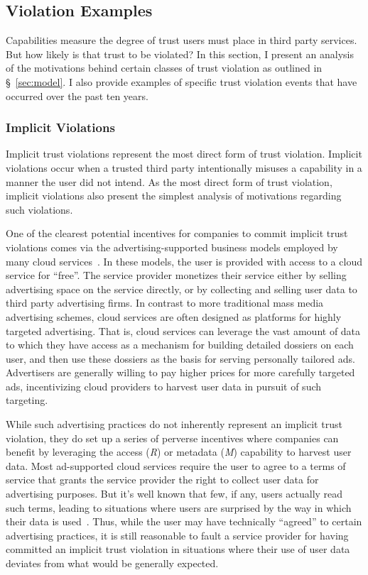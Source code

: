 \subsection{Violation Examples}
\label{sec:analysis:violations}

Capabilities measure the degree of trust users must place in third
party services. But how likely is that trust to be violated? In this
section, I present an analysis of the motivations behind certain
classes of trust violation as outlined in \S~\ref{sec:model}. I also
provide examples of specific trust violation events that have occurred
over the past ten years.

\subsubsection{Implicit Violations}

Implicit trust violations represent the most direct form of trust
violation. Implicit violations occur when a trusted third party
intentionally misuses a capability in a manner the user did not
intend. As the most direct form of trust violation, implicit
violations also present the simplest analysis of motivations regarding
such violations.

One of the clearest potential incentives for companies to commit
implicit trust violations comes via the advertising-supported business
models employed by many cloud services~\cite{evans2009}. In these
models, the user is provided with access to a cloud service for
``free''. The service provider monetizes their service either by
selling advertising space on the service directly, or by collecting
and selling user data to third party advertising firms. In contrast to
more traditional mass media advertising schemes, cloud services are
often designed as platforms for highly targeted advertising. That is,
cloud services can leverage the vast amount of data to which they have
access as a mechanism for building detailed dossiers on each user, and
then use these dossiers as the basis for serving personally tailored
ads. Advertisers are generally willing to pay higher prices for more
carefully targeted ads, incentivizing cloud providers to harvest user
data in pursuit of such targeting.

While such advertising practices do not inherently represent an
implicit trust violation, they do set up a series of perverse
incentives where companies can benefit by leveraging the access
(\emph{R}) or metadata (\emph{M}) capability to harvest user
data. Most ad-supported cloud services require the user to agree to a
terms of service that grants the service provider the right to collect
user data for advertising purposes. But it's well known that few, if
any, users actually read such terms, leading to situations where users
are surprised by the way in which their data is used~\cite{ hern2015,
  mcdonald2010}. Thus, while the user may have technically ``agreed''
to certain advertising practices, it is still reasonable to fault a
service provider for having committed an implicit trust violation in
situations where their use of user data deviates from what would be
generally expected.

